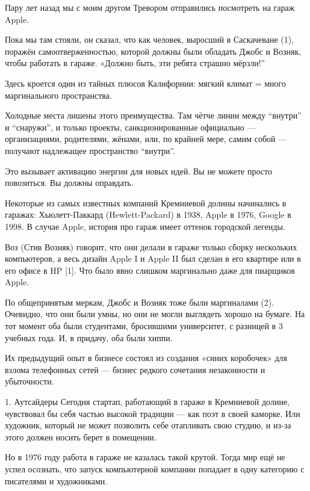 \documentclass[ebook,12pt,oneside,openany]{memoir}
\begin{document}
\maketitle

Пару лет назад мы с моим другом Тревором отправились посмотреть на
гараж Apple.

Пока мы там стояли, он сказал, что как человек, выросший в Саскачеване
(1), поражён самоотверженностью, которой должны были обладать Джобс и
Возняк, чтобы работать в гараже. «Должно быть, эти ребята страшно
мёрзли!”

Здесь кроется один из тайных плюсов Калифорнии: мягкий климат = много
маргинального пространства.

Холодные места лишены этого преимущества. Там чётче линии между
“внутри” и “снаружи”, и только проекты, санкционированные официально —
организациями, родителями, жёнами, или, по крайней мере, самим собой —
получают надлежащее пространство “внутри”.

Это вызывает активацию энергии для новых идей. Вы не можете просто
повозиться. Вы должны оправдать.

Некоторые из самых известных компаний Кремниевой долины начинались в
гаражах: Хьюлетт-Паккард (Hewlett-Packard) в 1938, Apple в 1976,
Google в 1998. В случае Apple, история про гараж имеет оттенок
городской легенды.

Воз (Стив Возняк) говорит, что они делали в гараже только сборку
нескольких компьютеров, а весь дизайн Apple I и Apple II был сделан в
его квартире или в его офисе в HP [1]. Что было явно слишком
маргинально даже для пиарщиков Apple.

По общепринятым меркам, Джобс и Возняк тоже были маргиналами (2).
Очевидно, что они были умны, но они не могли выглядеть хорошо на
бумаге. На тот момент оба были студентами, бросившими университет, с
разницей в 3 учебных года. И, в придачу, оба были хиппи.

Их предыдущий опыт в бизнесе состоял из создания «синих коробочек» для
взлома телефонных сетей — бизнес редкого сочетания незаконности и
убыточности.

1. Аутсайдеры Сегодня стартап, работающий в гараже в Кремниевой
долине, чувствовал бы себя частью высокой традиции — как поэт в своей
каморке. Или художник, который не может позволить себе отапливать свою
студию, и из-за этого должен носить берет в помещении.

Но в 1976 году работа в гараже не казалась такой крутой. Тогда мир ещё
не успел осознать, что запуск компьютерной компании попадает в одну
категорию с писателями и художниками.
\end{document}
